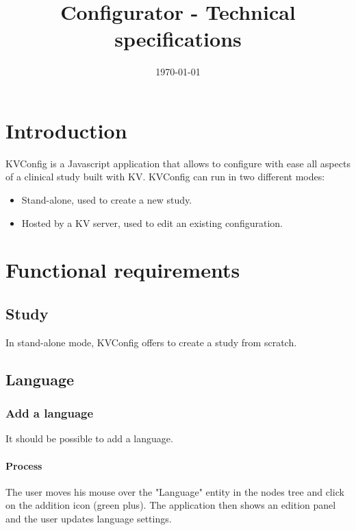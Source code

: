 \documentclass[11pt,a4paper,oneside]{article}
\begin{document}
\title{Configurator - Technical specifications}
\newcommand{\documentid}{Configurator-TechnicalSpecifications}
\newcommand{\version}{DEV-SNAPSHOT}
\date{\today}



\tableofcontents

\clearpage

\newcommand{\funcspec}[1] {\texttt{#1}}

\section{Introduction}
KVConfig is a Javascript application that allows to configure with ease all aspects of a clinical study built with KV. KVConfig can run in two different modes:
\begin{itemize}
	\item Stand-alone, used to create a new study.
	\item Hosted by a KV server, used to edit an existing configuration.
\end{itemize}

\section{Functional requirements}

\subsection{Study}
In stand-alone mode, KVConfig offers to create a study from scratch.

\subsection{Language}

\subsubsection{Add a language}
It should be possible to add a language.

\paragraph{Process}
The user moves his mouse over the "Language" entity in the nodes tree and click on the addition icon (green plus). The application then shows an edition panel and the user updates language settings.
\end{document}
